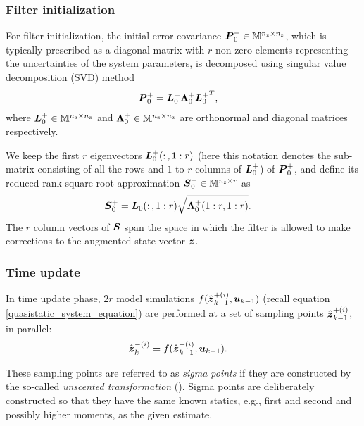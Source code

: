 \subsubsection*{Filter initialization}
For filter initialization, the initial error-covariance $\matr{P}_0^+  \in \Matrix^{n_\textnormal{z} \times n_\textnormal{z}}$, which is typically prescribed as a diagonal matrix with $r$ non-zero elements representing the uncertainties of the system parameters, is decomposed using singular value decomposition (SVD) method
\begin{align}
\matr{P}_0^+ &= \matr{L}_0^+ \matr{\Lambda}_0^+ {\matr{L}_0^+}^T , \label{eq-SEUK-initialization-01}
\end{align}
where $\matr{L}_0^+ \in \Matrix^{n_\textnormal{z} \times n_\textnormal{z}}$ and $\matr{\Lambda}_0^+ \in \Matrix^{n_\textnormal{z} \times n_\textnormal{z}}$ are orthonormal and diagonal matrices respectively.

We keep the first $r$ eigenvectors $\matr{L}_0^+(: \, ,1:r)$ (here this notation denotes the sub-matrix consisting of all the rows and $1$ to $r$ columns of $\matr{L}_0^+$) of $\matr{P}_0^+$, and define its reduced-rank square-root approximation $\matr{S}_0^+ \in \Matrix^{n_\textnormal{z} \times r}$ as
\begin{align}
\matr{S}_0^+ &= \matr{L}_0(: \, ,1:r)\sqrt{\matr{\Lambda}_0^+(1:r,1:r)}. \label{eq-SEUK-initialization-02}
\end{align}
The $r$ column vectors of $\matr{S}$ span the space in which the filter is allowed to make corrections to the augmented state vector $\vect{z}$.

\subsubsection*{Time update}
In time update phase, $2r$ model simulations $f(\hat{\vect{z}}_{k-1}^{+(i)},\vect{u}_{k-1})$ (recall equation \ref{quasistatic_system_equation}) are performed at a set of sampling points $\hat{\vect{z}}_{k-1}^{+(i)}$, in parallel:
\begin{align}
\hat{\vect{z}}_k^{-(i)} &= f(\hat{\vect{z}}_{k-1}^{+(i)},\vect{u}_{k-1}).
\end{align}

These sampling points are referred to as \emph{sigma points} if they are constructed by the so-called \emph{unscented transformation} (\citealt{Julier1997New}). Sigma points are deliberately constructed so that they have the same known statics, e.g., first and second and possibly higher moments, as the given estimate.

